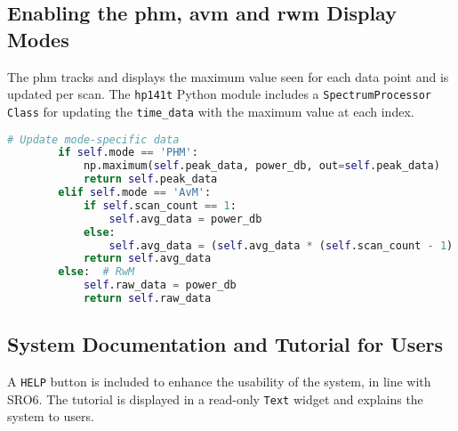 \documentclass[class=report,11pt,crop=false]{standalone}
\begin{document}
	\subsection{Enabling the \acrfull{phm}, \acrfull{avm} and \acrfull{rwm} Display Modes}
	The \acrshort{phm} tracks and displays the maximum value seen for each data point and is updated per scan. The \texttt{hp141t} Python module includes a \texttt{SpectrumProcessor Class} for updating the \texttt{time\_data} with the maximum value at each index. 
	
	\begin{lstlisting}[language=Python, caption={Code snippet for enabling the \acrshort{phm} when the user presses the \texttt{PHM} button on the screen.}, label={lst:guis-phm}]
		 # Update mode-specific data
		if self.mode == 'PHM':
			np.maximum(self.peak_data, power_db, out=self.peak_data)
			return self.peak_data
		elif self.mode == 'AvM':
			if self.scan_count == 1:
				self.avg_data = power_db
			else:
				self.avg_data = (self.avg_data * (self.scan_count - 1) + power_db) / self.scan_count
			return self.avg_data
		else:  # RwM
			self.raw_data = power_db
			return self.raw_data
	\end{lstlisting} 

	\subsection{System Documentation and Tutorial for Users}
	
	A \texttt{HELP} button is included to enhance the usability of the system, in line with SRO6. The tutorial is displayed in a read-only \texttt{Text} widget and explains the system to users.
	
\end{document}
